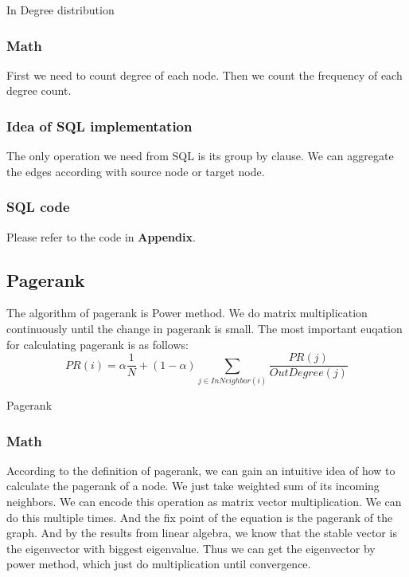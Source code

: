 \begin{algorithm}
\caption{In Degree distribution}
\begin{algorithmic}
\end{algorithmic}
\label{algo1:2}
\end{algorithm}

\subsubsection{Math}
First we need to count degree of each node. Then we count the frequency of each degree count. 

\subsubsection{Idea of SQL implementation}
The only operation we need from SQL is its group by clause. We can aggregate the edges according with source node or target node.

\subsubsection{SQL code}
Please refer to the code in {\bf Appendix}.

\subsection{Pagerank}
The algorithm of pagerank is Power method. We do matrix multiplication continuously until the change in pagerank is small. The most important euqation for calculating pagerank is as follows:
\begin{equation}
  PR(i) = \alpha \frac{1}{N} + (1 - \alpha) \sum_{j \in InNeighbor(i)} \frac{PR(j)}{OutDegree(j)}
\end{equation}
\begin{algorithm}
\caption{Pagerank}
\begin{algorithmic}
\REPEAT
{}
\end{algorithmic}
\end{algorithm}

\subsubsection{Math}
According to the definition of pagerank, we can gain an intuitive idea of how to calculate the pagerank of a node.
We just take weighted sum of its incoming neighbors. We can encode this operation as matrix vector multiplication.
We can do this multiple times. And the fix point of the equation is the pagerank of the graph. And by the results 
from linear algebra, we know that the stable vector is the eigenvector with biggest eigenvalue. Thus we can get 
the eigenvector by power method, which just do multiplication until convergence. 

